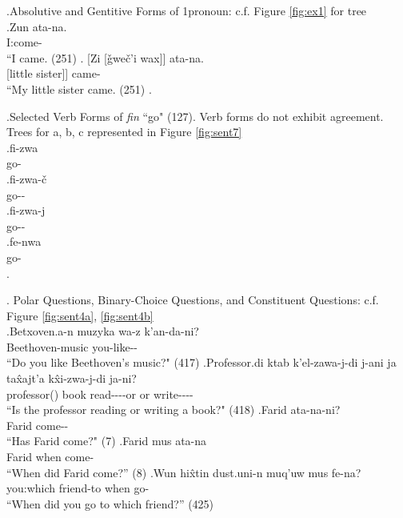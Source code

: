 \ex.\label{sent:ex1}Absolutive and Gentitive Forms of 1\Sg[] pronoun: c.f. Figure \ref{fig:ex1} for tree \\ 
    \ag.Zun ata-na. \\
        I:\Abs[] come-\Aori[] \\
        ``I came. (251)
    \bg. [Zi [\v{g}we\v{c}'i wax]] ata-na. \\
        [I:\Gen[] [little sister]] came-\Aori[] \\
        ``My little sister came. (251)
    \z.

\ex.\label{sent:ex7}Selected Verb Forms of \textit{fin} ``go" (127). Verb forms do not exhibit agreement. Trees for a, b, c represented in Figure \ref{fig:sent7} \\
    \ag.fi-zwa \\
    go-\Impf[] \\
    \bg.fi-zwa-\v{c} \\
    go-\Impf[]-\Neg[] \\
    \cg.fi-zwa-j \\
    go-\Impf[]-\Pst[] \\
    \dg.fe-nwa \\
    go-\Prf[] \\
    \z.

\ex. \label{sent:ex4}Polar Questions, Binary-Choice Questions, and Constituent Questions: c.f. Figure \ref{fig:sent4a}, \ref{fig:sent4b} \\
    \ag.\label{sent:ex4a}Betxoven.a-n muzyka wa-z k'an-da-ni? \\
    Beethoven-\Gen[] music you-\Dat[] like-\Fut[]-\Q[] \\
    ``Do you like Beethoven's music?" (417)
    \bg.\label{sent:ex4b}Professor.di ktab k'el-zawa-j-di j-ani ja ta\^{x}ajt'a k\^{x}i-zwa-j-di ja-ni? \\
    professor(\Erg[]) book read-\Impf[]-\Ptcp[]-\Sbstz[] \Cop[]-\Q[] or or write-\Impf[]-\Ptcp[]-\Sbstz[] \Cop[]-\Q[] \\
    ``Is the professor reading or writing a book?" (418)
    \cg.\label{sent:ex4c}Farid ata-na-ni? \\
    Farid come-\Aori-\Q \\
    ``Has Farid come?" (7)
    \dg.\label{sent:ex4d}Farid mus ata-na \\
    Farid when come-\Aori \\
    ``When did Farid come?'' (8)
    \eg.\label{sent:ex4e}Wun hi\^{x}tin dust.uni-n muq'uw mus fe-na? \\
    you:\Abs[] which friend-\Gen[] to when go-\Aori[] \\
    ``When did you go to which friend?'' (425)

